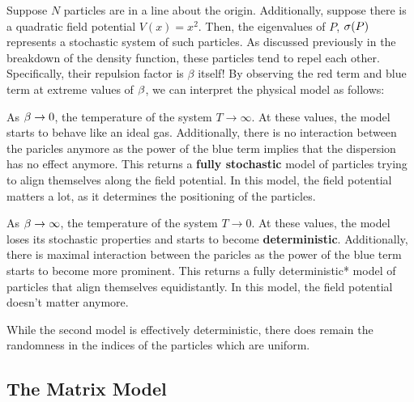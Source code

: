 
Suppose $N$ particles are in a line about the origin. Additionally, suppose there is a quadratic field potential $V(x) = x^2$.
Then, the eigenvalues of $P$, $\sigma(P)$ represents a stochastic system of such particles. As discussed previously in the breakdown of the density function,
these particles tend to repel each other. Specifically, their repulsion factor is $\beta$ itself! By observing the red term and blue term at extreme values of $\beta$,
we can interpret the physical model as follows:
\medskip

 As $\beta \to 0$, the temperature of the system $T \to \infty$.
At these values, the model starts to behave like an ideal gas.
Additionally, there is no interaction between the paricles anymore as the power of the blue term implies that the dispersion has no effect anymore. This returns a \textbf{fully stochastic} model of particles trying to align themselves along the field potential. In this model, the field potential matters a lot, as it determines the positioning of the particles.

\bigskip

 As $\beta \to \infty$, the temperature of the system $T \to 0$.
At these values, the model loses its stochastic properties and starts to become \textbf{deterministic}.
Additionally, there is maximal interaction between the paricles as the power of the blue term starts to become more prominent. This returns a fully deterministic*
model of particles that align themselves equidistantly. In this model, the field potential doesn't matter anymore.

\medskip

\begin{remark}
While the second model is effectively deterministic, there does remain the randomness in the indices of the particles which are uniform.
\end{remark}




\newpage
\subsection{The Matrix Model}

